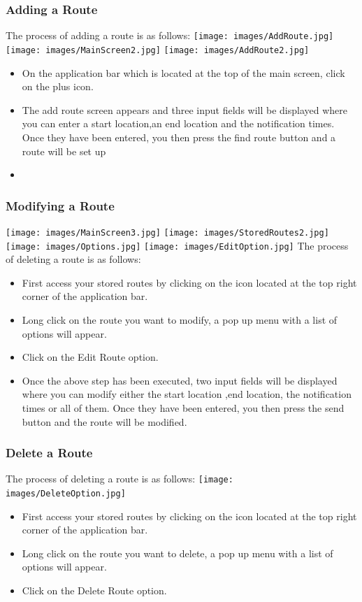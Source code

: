 \documentclass[a4paper,12pt]{article}
\begin{document}
\subsubsection{Adding a Route}
The process of adding a route is as follows:
\texttt{[image: images/AddRoute.jpg]}
\texttt{[image: images/MainScreen2.jpg]}
\texttt{[image: images/AddRoute2.jpg]}
\begin{itemize}
    \item On the application bar which is located at the top of the main screen, click on the plus icon.
    \item The add route screen appears and three input fields will be displayed  where you can enter a start location,an end location and the notification times. Once they have been entered, you then press the find route button and a route will be set up
    \item 
\end{itemize}
\subsubsection{Modifying a Route}
\texttt{[image: images/MainScreen3.jpg]}
\texttt{[image: images/StoredRoutes2.jpg]}
\texttt{[image: images/Options.jpg]}
\texttt{[image: images/EditOption.jpg]}
The process of deleting a route is as follows:
\begin{itemize}
    \item First access your stored routes by  clicking on the icon located at the top right corner of the application bar. 
    \item Long click on the route you want to modify, a pop up menu with a list of options will appear.
    \item Click on the Edit Route option.
    \item Once the above step has been executed, two input fields will be displayed  where you can modify either the start location ,end location, the notification times  or all of them. Once they have been entered, you then press the send button and the route will be modified.
\end{itemize}
\subsubsection{Delete a Route}
The process of deleting a route is as follows:
\texttt{[image: images/DeleteOption.jpg]}
\begin{itemize}
    \item First access your stored routes by  clicking on the icon located at the top right corner of the application bar. 
    \item Long click on the route you want to delete, a pop up menu with a list of options will appear.
    \item Click on the Delete Route option.
\end{itemize}
\end{document}
